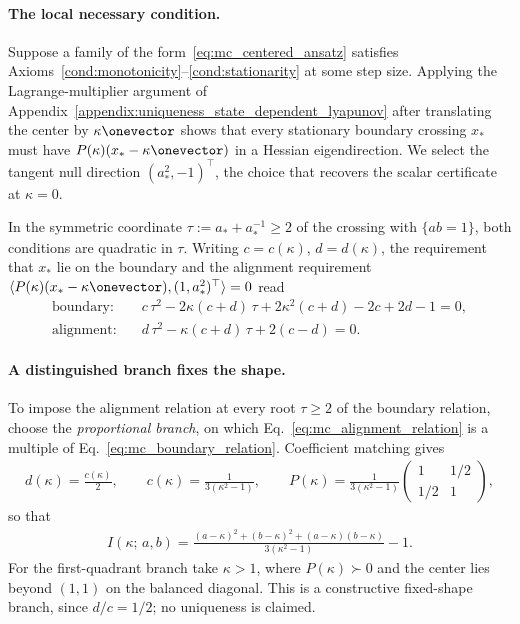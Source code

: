 \documentclass{article}
\begin{document}
\paragraph{The local necessary condition.}
Suppose a family of the form~\eqref{eq:mc_centered_ansatz} satisfies
Axioms~\ref{cond:monotonicity}--\ref{cond:stationarity} at some step size.
Applying the Lagrange-multiplier argument of
Appendix~\ref{appendix:uniqueness_state_dependent_lyapunov} after translating
the center by $\kappa\onevector$ shows that every stationary boundary crossing
$x_*$ must have $P(\kappa)(x_*-\kappa\onevector)$ in a Hessian eigendirection.
We select the tangent null direction $(a_*^2,-1)^\top$, the choice that
recovers the scalar certificate at $\kappa=0$.

In the symmetric coordinate $\tau := a_* + a_*^{-1}\ge 2$ of the crossing with
$\{ab=1\}$, both conditions are quadratic in $\tau$. Writing $c=c(\kappa)$,
$d=d(\kappa)$, the requirement that $x_*$ lie on the boundary and the
alignment requirement
$\langle P(\kappa)(x_*-\kappa\onevector),(1,a_*^2)^\top\rangle=0$ read
\begin{align}
    \text{boundary:}\quad
    &c\,\tau^2 - 2\kappa(c+d)\,\tau + 2\kappa^2(c+d) - 2c + 2d - 1 = 0,
    \label{eq:mc_boundary_relation}
    \\
    \text{alignment:}\quad
    &d\,\tau^2 - \kappa(c+d)\,\tau + 2(c-d) = 0 .
    \label{eq:mc_alignment_relation}
\end{align}

\paragraph{A distinguished branch fixes the shape.}
To impose the alignment relation at every root $\tau\ge2$ of the boundary
relation, choose the \emph{proportional branch}, on which
Eq.~\eqref{eq:mc_alignment_relation} is a multiple of
Eq.~\eqref{eq:mc_boundary_relation}. Coefficient matching gives
\begin{align}
    d(\kappa) = \frac{c(\kappa)}{2},
    \qquad
    c(\kappa) = \frac{1}{3(\kappa^2-1)},
    \qquad
    P(\kappa)
    =
    \frac{1}{3(\kappa^2-1)}
    \begin{pmatrix}
        1 & 1/2 \\
        1/2 & 1
    \end{pmatrix},
    \label{eq:mc_proportional_branch}
\end{align}
so that
\begin{align}
    I(\kappa;\, a, b)
    =
    \frac{(a-\kappa)^2 + (b-\kappa)^2 + (a-\kappa)(b-\kappa)}
         {3(\kappa^2-1)}
    - 1 .
    \label{eq:mc_certificate}
\end{align}
For the first-quadrant branch take $\kappa>1$, where $P(\kappa)\succ0$ and the
center lies beyond $(1,1)$ on the balanced diagonal. This is a constructive
fixed-shape branch, since $d/c=1/2$; no uniqueness is claimed.
\end{document}
